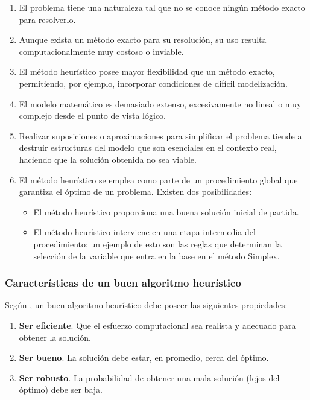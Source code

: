 \documentclass[12pt,titlepage,twoside,openright]{book}
\begin{document}
\begin{enumerate}[label=\alph*.]
	\item El problema tiene una naturaleza tal que no se conoce ningún método exacto para resolverlo.
	\item Aunque exista un método exacto para su resolución, su uso resulta computacionalmente muy costoso o inviable.
	\item El método heurístico posee mayor flexibilidad que un método exacto, permitiendo, por ejemplo, incorporar condiciones de difícil modelización.
	\item El modelo matemático es demasiado extenso, excesivamente no lineal o muy complejo desde el punto de vista lógico.
	\item Realizar suposiciones o aproximaciones para simplificar el problema tiende a destruir estructuras del modelo que son esenciales en el contexto real, haciendo que la solución obtenida no sea viable.
	\item El método heurístico se emplea como parte de un procedimiento global que garantiza el óptimo de un problema. Existen dos posibilidades:
	      \begin{itemize}
		      \item El método heurístico proporciona una buena solución inicial de partida.
		      \item El método heurístico interviene en una etapa intermedia del procedimiento; un ejemplo de esto son las reglas que determinan la selección de la variable que entra en la base en el método Simplex.
	      \end{itemize}
\end{enumerate}

\subsubsection*{Características de un buen algoritmo heurístico}

Según \citep{antonioSuarez2014}, un buen algoritmo heurístico debe poseer las siguientes propiedades:

\begin{enumerate}[label=\alph*.]
	\item \textbf{Ser eficiente}. Que el esfuerzo computacional sea realista y adecuado para obtener la solución.
	\item \textbf{Ser bueno}. La solución debe estar, en promedio, cerca del óptimo.
	\item \textbf{Ser robusto}. La probabilidad de obtener una mala solución (lejos del óptimo) debe ser baja.
\end{enumerate}
\end{document}
